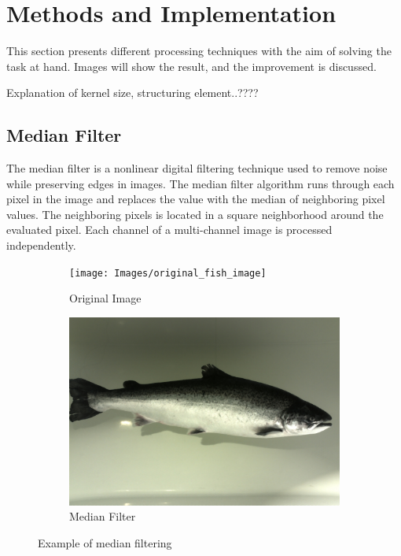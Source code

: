 \section{Methods and Implementation}\label{methods and implementation}

This section presents different processing techniques with the aim of solving the task at hand. Images will show the result, and the improvement is discussed. 

{\color{red}Explanation of kernel size, structuring element..????}


\subsection{Median Filter}
The median filter is a nonlinear digital filtering technique used to remove noise while preserving edges in images. The median filter algorithm runs through each pixel in the image and replaces the value with the median of neighboring pixel values. The neighboring pixels is located in a square neighborhood around the evaluated pixel. Each channel of a multi-channel image is processed independently. 

\begin{figure}[h]
    \centering
    \begin{subfigure}{0.5\textwidth}
        \centering
        \texttt{[image: Images/original\_fish\_image]}
        \caption{Original Image}
    \end{subfigure}%
    \begin{subfigure}{.5\textwidth}
        \centering
        \includegraphics[width=.9\linewidth]{Images/median_filter}
        \caption{Median Filter}
    \end{subfigure}
    \caption{Example of median filtering}
    \label{fig:median_filter}
\end{figure}

